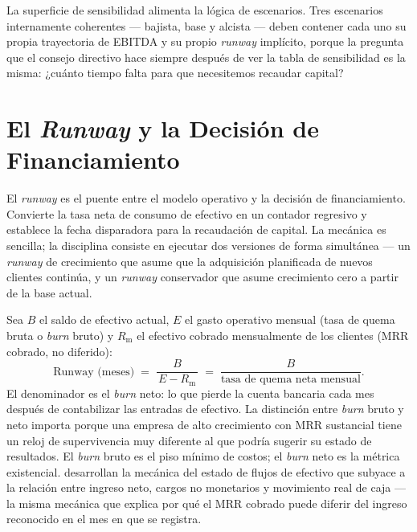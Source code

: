 La superficie de sensibilidad alimenta la lógica de escenarios. Tres escenarios internamente
coherentes --- bajista, base y alcista --- deben contener cada uno su propia trayectoria de
EBITDA y su propio \emph{runway} implícito, porque la pregunta que el consejo directivo hace
siempre después de ver la tabla de sensibilidad es la misma: ¿cuánto tiempo falta para que
necesitemos recaudar capital?


\section{El \emph{Runway} y la Decisión de Financiamiento}\label{sec:runway}

El \emph{runway} es el puente entre el modelo operativo y la decisión de financiamiento.
Convierte la tasa neta de consumo de efectivo en un contador regresivo y establece la fecha
disparadora para la recaudación de capital. La mecánica es sencilla; la disciplina consiste en
ejecutar dos versiones de forma simultánea --- un \emph{runway} de crecimiento que asume que la
adquisición planificada de nuevos clientes continúa, y un \emph{runway} conservador que asume
crecimiento cero a partir de la base actual.

Sea $B$ el saldo de efectivo actual, $E$ el gasto operativo mensual (tasa de quema bruta o
\emph{burn} bruto) y $R_{\mathrm{m}}$ el efectivo cobrado mensualmente de los clientes (MRR
cobrado, no diferido):
\begin{equation}\label{eq:runway}
  \text{Runway (meses)}
  \;=\;
  \frac{B}{\,E - R_{\mathrm{m}}\,}
  \;=\;
  \frac{B}{\text{tasa de quema neta mensual}}.
\end{equation}
El denominador es el \emph{burn} neto: lo que pierde la cuenta bancaria cada mes después de
contabilizar las entradas de efectivo. La distinción entre \emph{burn} bruto y neto importa
porque una empresa de alto crecimiento con MRR sustancial tiene un reloj de supervivencia muy
diferente al que podría sugerir su estado de resultados. El \emph{burn} bruto es el piso
mínimo de costos; el \emph{burn} neto es la métrica existencial.
\textcite{brealey2020} desarrollan la mecánica del estado de flujos de efectivo que subyace a la
relación entre ingreso neto, cargos no monetarios y movimiento real de caja --- la misma
mecánica que explica por qué el MRR cobrado puede diferir del ingreso reconocido en el mes en
que se registra.


